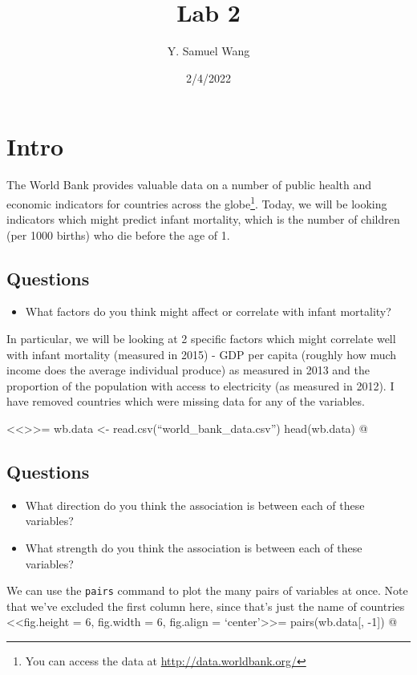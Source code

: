 \documentclass[
]{article}
\title{Lab 2}
\author{Y. Samuel Wang}
\date{2/4/2022}
\begin{document}
\maketitle

\hypertarget{intro}{%
\section{Intro}\label{intro}}

The World Bank provides valuable data on a number of public health and
economic indicators for countries across the globe\footnote{You can
  access the data at \url{http://data.worldbank.org/}}. Today, we will
be looking indicators which might predict infant mortality, which is the
number of children (per 1000 births) who die before the age of 1.

\subsection*{Questions}
\begin{itemize}
\item What factors do you think might affect or correlate with infant mortality?
\end{itemize}

In particular, we will be looking at 2 specific factors which might
correlate well with infant mortality (measured in 2015) - GDP per capita
(roughly how much income does the average individual produce) as
measured in 2013 and the proportion of the population with access to
electricity (as measured in 2012). I have removed countries which were
missing data for any of the variables.

\textless\textless\textgreater\textgreater= wb.data \textless-
read.csv(``world\_bank\_data.csv'') head(wb.data) @

\subsection*{Questions}
\begin{itemize}
\item What direction do you think the association is between each of these variables?
\item What strength do you think the association is between each of these variables?
\end{itemize}

We can use the \texttt{pairs} command to plot the many pairs of
variables at once. Note that we've excluded the first column here, since
that's just the name of countries \textless\textless fig.height = 6,
fig.width = 6, fig.align = `center'\textgreater\textgreater=
pairs(wb.data{[}, -1{]}) @
\end{document}

